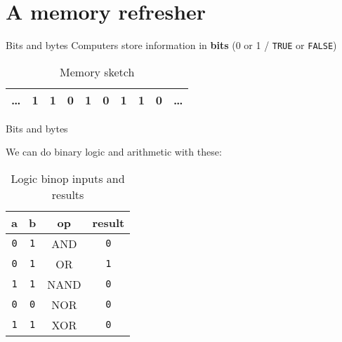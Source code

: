 \documentclass[../index.tex]{subfiles}
\begin{document}
\renewcommand{\sectiontitle}{A memory refresher}
\section{\sectiontitle}

\renewcommand{\currenttitle}{Bits and bytes}
\begin{frame}{\currenttitle}
%
  Computers store information in \textbf{bits} (0 or 1 / \texttt{TRUE} or \texttt{FALSE})
  \vspace*{2em}

  \begin{table}
    \centering
    \begin{tabular}{c|c|c|c|c|c|c|c|c|c}
      \hline
      \dots & 1 & 1 & 0 & 1 & 0 & 1 & 1 & 0 & \dots \\
      \hline
    \end{tabular}
    \caption{Memory sketch}
  \end{table}
\end{frame}

\begin{frame}{\currenttitle}
  \newcommand{\false}{\texttt{0}}
  \newcommand{\true}{\texttt{1}}

  We can do binary logic and arithmetic with these:

  \begin{table}
    \begin{tabular}{c c c c}
      a & b & op & result \\
      \hline
      \false  & \true   & AND   & \false  \\ %
      \false  & \true   & OR    & \true   \\ %
      \true   & \true   & NAND  & \false  \\ %
      \false  & \false  & NOR   & \false  \\ %
      \true   & \true   & XOR   & \false     %
    \end{tabular}
    \caption{Logic binop inputs and results}
  \end{table}
\end{frame}
\end{document}
